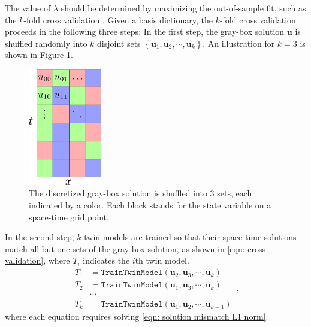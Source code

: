 The value of $\lambda$ should be determined by maximizing the 
out-of-sample fit, such as the $k$-fold cross validation
\cite{cross validation}. 
Given a basis dictionary, the $k$-fold cross validation proceeds in the following three steps:
In the first step, the gray-box solution $\boldsymbol{u}$ is shuffled randomly into $k$ disjoint sets
$\left\{\boldsymbol{u}_1 , \boldsymbol{u}_2, \cdots, \boldsymbol{u}_k\right\}$.
An illustration for $k=3$ is shown in Figure \ref{fig: shuffle}.
\begin{figure}[htbp]
    \begin{center}
        \includegraphics[width=3.2cm]{../shuffle_1.png}
        \caption{The discretized 
                 gray-box solution is shuffled into $3$ sets, each indicated by a color. 
                 Each block stands for the state variable on a space-time grid point.}
        \label{fig: shuffle}
    \end{center}
\end{figure}

In the second step, $k$ twin models are trained so that their space-time solutions match
all but one sets of the gray-box solution, as shown in \eqref{eqn: cross validation}, where
$T_i$ indicates the $i$th twin model.
\begin{equation}\begin{split}
T_1 &= \texttt{TrainTwinModel}(\boldsymbol{u}_2, \boldsymbol{u}_3, \cdots, \boldsymbol{u}_k)\\
T_2 &= \texttt{TrainTwinModel}(\boldsymbol{u}_1, \boldsymbol{u}_3, \cdots, \boldsymbol{u}_k)\\
&\cdots\\
T_k &= \texttt{TrainTwinModel}(\boldsymbol{u}_1, \boldsymbol{u}_2, \cdots, \boldsymbol{u}_{k-1})
\label{eqn: cross validation}
\end{split}\,,\end{equation}
where each equation requires solving \eqref{eqn: solution mismatch L1 norm}.\\

